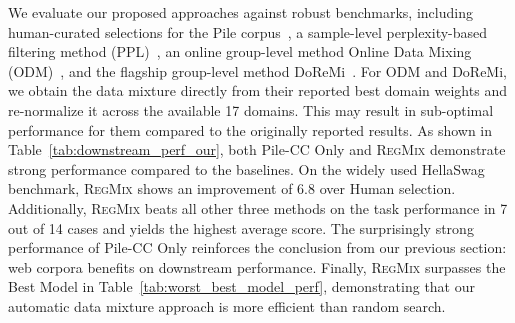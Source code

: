 \documentclass{article}
\theoremstyle{definition}
\theoremstyle{remark}
\newcommand{\ourmethod}{\textsc{RegMix}\xspace}
\begin{document}
We evaluate our proposed approaches against robust benchmarks, including human-curated selections for the Pile corpus~\citep{the_pile_corpus}, a sample-level perplexity-based filtering method (PPL)~\citep{zachary2024perplexed}, an online group-level method Online Data Mixing (ODM)~\citep{albalak2023efficient}, and the flagship group-level method DoReMi~\citep{xie2023doremi}. 
For ODM and DoReMi, we obtain the data mixture directly from their reported best domain weights and re-normalize it across the available 17 domains. This may result in sub-optimal performance for them compared to the originally reported results. As shown in Table~\ref{tab:downstream_perf_our}, both Pile-CC Only and \ourmethod demonstrate strong performance compared to the baselines. On the widely used HellaSwag benchmark, \ourmethod shows an improvement of $6.8$ over Human selection. Additionally, \ourmethod beats all other three methods on the task performance in 7 out of 14 cases and yields the highest average score. The surprisingly strong performance of Pile-CC Only reinforces the conclusion from our previous section: web corpora benefits on downstream performance. Finally, \ourmethod surpasses the Best Model in Table~\ref{tab:worst_best_model_perf}, demonstrating that our automatic data mixture approach is more efficient than random search.
\end{document}
